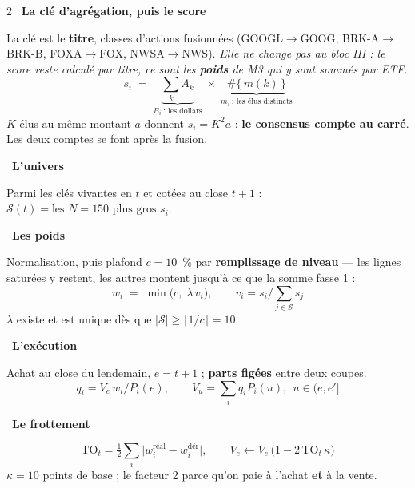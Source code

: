 \documentclass[9pt,a4paper]{extarticle}
\newcommand{\etape}[2]{\vspace{0.9mm}{\color{rouge}\bfseries #1.}~{\bfseries #2}\par\vspace{0.15mm}}
\begin{document}
\begin{multicols}{2}
\etape{5}{La clé d'agrégation, puis le score}
La clé est le \textbf{titre}, classes d'actions fusionnées (GOOGL$\to$GOOG, BRK-A$\to$BRK-B, FOXA$\to$FOX,
NWSA$\to$NWS). \emph{Elle ne change pas au bloc III : le score reste calculé par titre, ce sont les
\textbf{poids} de M3 qui y sont sommés par ETF.}
\[ s_{i} \;=\; \underbrace{\textstyle\sum_{k} A_k}_{B_i \ \text{: les dollars}}
   \;\times\; \underbrace{\#\{\,m(k)\,\}}_{m_i \ \text{: les élus distincts}} \]
$K$ élus au même montant $a$ donnent $s_i = K^2 a$ : \textbf{le consensus compte au carré}. Les deux comptes
se font après la fusion.

\etape{6}{L'univers}
Parmi les clés vivantes en $t$ et cotées au close $t+1$ :
$\mathcal S(t) = \text{les } N = 150 \text{ plus gros } s_i$.

\etape{7}{Les poids}
Normalisation, puis plafond $c = 10$~\% par \textbf{remplissage de niveau} --- les lignes saturées y restent,
les autres montent jusqu'à ce que la somme fasse 1 :
\[ \boxed{\;w_i \;=\; \min\bigl(c,\; \lambda\, v_i\bigr), \qquad v_i = s_i \Big/ \textstyle\sum_{j\in\mathcal S} s_j\;} \]
$\lambda$ existe et est unique dès que $\lvert\mathcal S\rvert \ge \lceil 1/c\rceil = 10$.

\etape{8}{L'exécution}
Achat au close du lendemain, $e = t+1$ ; \textbf{parts figées} entre deux coupes.
\[ q_i = V_e\,w_i / P_i(e), \qquad V_u = \textstyle\sum_i q_i P_i(u),\ \ u \in (e, e'] \]

\etape{9}{Le frottement}
\[ \mathrm{TO}_t = \tfrac12\textstyle\sum_i \bigl\lvert w^{\text{réal}}_i - w^{\text{dér}}_i \bigr\rvert,
   \qquad V_e \leftarrow V_e\,\bigl(1 - 2\,\mathrm{TO}_t\,\kappa\bigr) \]
$\kappa = 10$ points de base ; le facteur 2 parce qu'on paie à l'achat \textbf{et} à la vente.


\end{multicols}
\end{document}
